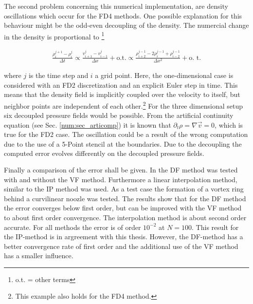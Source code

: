 The second problem concerning this numerical implementation, are density oscillations
which occur for the FD4 methods.
One possible explanation for this behaviour might be the odd-even decoupling of the density.
The numercial change in the density is  proportional to \footnote{o.t. = other terms}


\begin{align}
    \frac{\rho^{j+1}_{i} -  \rho^{j}_i}{\Delta t}  \propto \frac{ v^j_{i+1} - v^j_{i-1}}{\Delta x} + \text{o.t.}
     \propto \frac{\rho^{j-1}_{i+2} - 2 \rho^{j-1}_{i}  + \rho^{j-1}_{i-2}}{\Delta x^2} + \text{o. t.}
\end{align}

where $j$ is the time step and $i$ a grid point. Here, the one-dimensional case is considered with an FD2 discretization and an explicit Euler step in time.
This means that the density field is implicitly coupled over the velocity to itself,
but neighbor points are independent of each other.\footnote{This example also holds for the FD4 method.}
For the three dimensional setup six decoupled pressure fields would be possible.
From the artificial continuity equation (see Sec. \ref{num:sec_articomp})
it is known that $\partial_t \rho  = \nabla \vec{v} =  0$, which is true for the FD2 case.
The oscillation could be a result of the  wrong computation due to the use of a 5-Point stencil at the boundaries.
Due to the decoupling the computed error evolves differently on the decoupled pressure fields.
\bigbreak

Finally a comparison of the error shall be given.
In \citep{Fadlun2000} the DF method was tested with and without the VF method.
Furthermore a linear interpolation method, similar to the IP method was used.
As a test case the formation of a vortex ring behind a curvilinear noozle was tested.
The results show that for the DF method the error converges below first order, but can be
improved with the VF method to about first order convergence.
The interpolation method is about second order accurate.
For all methods the error is of order $10^{-2}$ at $N=100$.
This result for the IP-method is in argreement with this thesis. However, the DF-method has a better convergence rate of first order and
the additional use of the VF method has a smaller influence.

